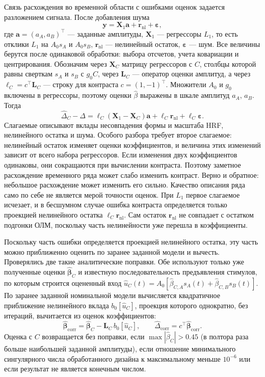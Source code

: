 Связь расхождения во временной области с ошибками оценок задается разложением сигнала. После добавления шума
\begin{equation}\label{eq:decomp}
\mathbf y=\mathbf X_1\mathbf a+\mathbf r_{\mathrm{nl}}+\boldsymbol\varepsilon,
\end{equation}
где $\mathbf a=(a_A,a_B)^\top$ --- заданные амплитуды, $\mathbf X_1$ --- регрессоры $L_1$, то есть отклики $L_1$ на $A_0s_A$ и $A_0s_B$, $\mathbf r_{\mathrm{nl}}$ --- нелинейный остаток, $\boldsymbol\varepsilon$ --- шум. Все величины берутся после одинаковой обработки: выбора отсчетов, учета ковариации и центрирования. Обозначим через $\mathbf X_C$ матрицу регрессоров с $C$, столбцы которой равны сверткам $s_A$ и $s_B$ с $g_0C$, через $\mathbf L_C$ --- оператор оценки амплитуд, а через $\ell_C=c^\top\mathbf L_C$ --- строку для контраста $c=(1,-1)^\top$. Множители $A_0$ и $g_0$ включены в регрессоры, поэтому оценки $\hat\beta$ выражены в шкале амплитуд $a_A$, $a_B$. Тогда
\begin{equation}\label{eq:errdec}
\hat\Delta_C-\Delta=
\ell_C(\mathbf X_1-\mathbf X_C)\mathbf a+
\ell_C\mathbf r_{\mathrm{nl}}+
\ell_C\boldsymbol\varepsilon.
\end{equation}
Слагаемые описывают вклады несовпадения формы и масштаба HRF, нелинейного остатка и шума. Особого разбора требует второе слагаемое: нелинейный остаток изменяет оценки коэффициентов, и величина этих изменений зависит от всего набора регрессоров. Если изменения двух коэффициентов одинаковы, они сокращаются при вычислении контраста. Поэтому заметное расхождение временного ряда может слабо изменить контраст. Верно и обратное: небольшое расхождение может изменить его сильно. Качество описания ряда само по себе не является мерой точности оценок. При $L_1$ первое слагаемое исчезает, и в бесшумном случае ошибка контраста определяется только проекцией нелинейного остатка $\ell_C\mathbf r_{\mathrm{nl}}$. Сам остаток $\mathbf r_{\mathrm{nl}}$ не совпадает с остатком подгонки ОЛМ, поскольку часть нелинейности уже перешла в коэффициенты.

Поскольку часть ошибки определяется проекцией нелинейного остатка, эту часть можно приближенно оценить по заранее заданной модели и вычесть. Проверялись две такие аналитические поправки. Обе используют только уже полученные оценки $\hat{\boldsymbol\beta}_C$ и известную последовательность предъявления стимулов, по которым строится оцененный вход $\hat u_C(t)=A_0[\hat\beta_{C,A}s_A(t)+\hat\beta_{C,B}s_B(t)]$. По заранее заданной номинальной модели вычисляется квадратичное приближение нелинейного вклада $b_0[\hat u_C]$, проекция которого однократно, без итераций, вычитается из оценок коэффициентов:
\begin{equation}\label{eq:corr}
\hat{\boldsymbol\beta}_{\mathrm{corr}}
=\hat{\boldsymbol\beta}_C-
\mathbf L_C\, b_0[\hat u_C],
\qquad
\hat\Delta_{\mathrm{corr}}
=c^\top\hat{\boldsymbol\beta}_{\mathrm{corr}}.
\end{equation}
Оценка с $C$ возвращается без поправки, если $\max|\hat\beta_C|>0.45$ (в полтора раза больше наибольшей заданной амплитуды), если отношение минимального сингулярного числа обработанного дизайна к максимальному меньше $10^{-6}$ или если результат не является конечным числом.

